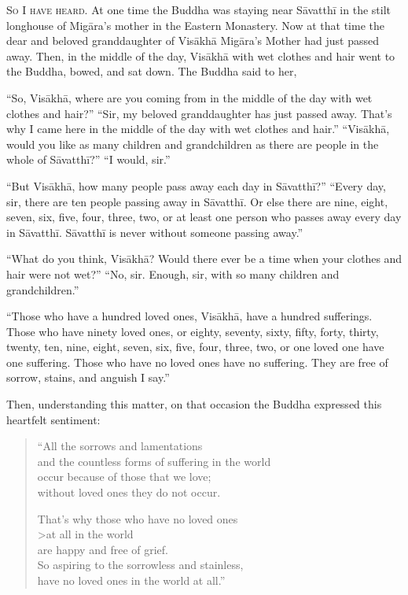 \documentclass[12pt,openany]{book}%
\newcommand*{\scevam}[1]{\textsc{#1}}
\begin{document}
\scevam{So I have heard. }At one time the Buddha was staying near \textsanskrit{Sāvatthī} in the stilt longhouse of \textsanskrit{Migāra}’s mother in the Eastern Monastery. Now at that time the dear and beloved granddaughter of \textsanskrit{Visākhā} \textsanskrit{Migāra}’s Mother had just passed away. Then, in the middle of the day, \textsanskrit{Visākhā} with wet clothes and hair went to the Buddha, bowed, and sat down. The Buddha said to her, 

“So, \textsanskrit{Visākhā}, where are you coming from in the middle of the day with wet clothes and hair?” “Sir, my beloved granddaughter has just passed away. That’s why I came here in the middle of the day with wet clothes and hair.” “\textsanskrit{Visākhā}, would you like as many children and grandchildren as there are people in the whole of \textsanskrit{Sāvatthī}?” “I would, sir.” 

“But \textsanskrit{Visākhā}, how many people pass away each day in \textsanskrit{Sāvatthī}?” “Every day, sir, there are ten people passing away in \textsanskrit{Sāvatthī}. Or else there are nine, eight, seven, six, five, four, three, two, or at least one person who passes away every day in \textsanskrit{Sāvatthī}. \textsanskrit{Sāvatthī} is never without someone passing away.” 

“What do you think, \textsanskrit{Visākhā}? Would there ever be a time when your clothes and hair were not wet?” “No, sir. Enough, sir, with so many children and grandchildren.” 

“Those who have a hundred loved ones, \textsanskrit{Visākhā}, have a hundred sufferings. Those who have ninety loved ones, or eighty, seventy, sixty, fifty, forty, thirty, twenty, ten, nine, eight, seven, six, five, four, three, two, or one loved one have one suffering. Those who have no loved ones have no suffering. They are free of sorrow, stains, and anguish I say.” 

Then, understanding this matter, on that occasion the Buddha expressed this heartfelt sentiment: 

\begin{verse}%
“All the sorrows and lamentations \\
and the countless forms of suffering in the world \\
occur because of those that we love; \\
without loved ones they do not occur. 

That’s why those who have no loved ones \\>at all in the world \\
are happy and free of grief. \\
So aspiring to the sorrowless and stainless, \\
have no loved ones in the world at all.” 

%
\end{verse}
\end{document}
